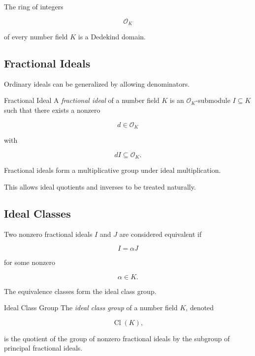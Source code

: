 The ring of integers

\[ \mathcal O_K \]

of every number field \(K\) is a Dedekind domain.

\subsection{Fractional Ideals}
\label{subsec:fractional-ideals}

Ordinary ideals can be generalized by allowing denominators.

\begin{definitionbox}{Fractional Ideal}
A \emph{fractional ideal} of a number field \(K\) is an
\(\mathcal O_K\)-submodule \(I\subseteq K\) such that there exists a nonzero

\[ d\in\mathcal O_K \]

with

\[ dI\subseteq\mathcal O_K. \]
\end{definitionbox}

Fractional ideals form a multiplicative group under ideal multiplication.

This allows ideal quotients and inverses to be treated naturally.

\subsection{Ideal Classes}
\label{subsec:ideal-classes}

Two nonzero fractional ideals \(I\) and \(J\) are considered equivalent if

\[ I=\alpha J \]

for some nonzero

\[ \alpha\in K. \]

The equivalence classes form the ideal class group.

\begin{definitionbox}{Ideal Class Group}
The \emph{ideal class group} of a number field \(K\), denoted

\[ \operatorname{Cl}(K), \]

is the quotient of the group of nonzero fractional ideals by the subgroup
of principal fractional ideals.
\end{definitionbox}

